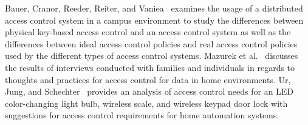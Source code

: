 Bauer, Cranor, Reeder, Reiter, and Vaniea~\cite{policyCreation} examines the
usage of a distributed access control system in a campus environment to study
the differences between physical key-based access control and an access control
system as well as the differences between ideal access control policies and real
access control policies used by the different types of access control systems.
Mazurek et al.~\cite{accessControl} discusses the results of interviews
conducted with families and individuals in regards to thoughts and practices for
access control for data in home environments. Ur, Jung, and
Schechter~\cite{currentState} provides an analysis of access control needs for
an LED color-changing light bulb, wireless scale, and wireless keypad door lock
with suggestions for access control requirements for home automation systems.
